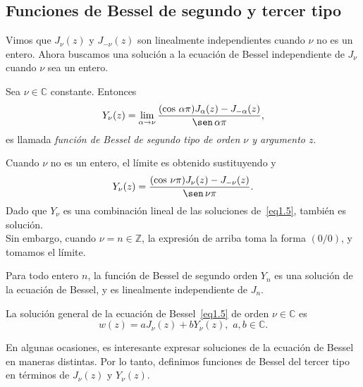 \documentclass[main.tex]{subfiles}
\begin{document}
\subsection{Funciones de Bessel de segundo y tercer tipo}
\noindent Vimos que $J_{\nu}(z)$ y $J_{-\nu}(z)$ son linealmente independientes cuando $\nu$ no es un entero. Ahora buscamos una solución a la ecuación de Bessel independiente de $J_{\nu}$ cuando $\nu$ sea un entero.
\begin{def.}\label{d1.5} %
  Sea $\nu\in\mathbb{C}$ constante. Entonces
  \begin{equation}
    \label{eq1.8}
    Y_{\nu}(z)=\lim_{\alpha\to\nu}\frac{(\cos\,\alpha\pi)J_{\alpha}(z)-J_{-\alpha}(z)}{\sen\,\alpha\pi},
  \end{equation}
  es llamada \textit{función de Bessel de segundo tipo de orden $\nu$ y argumento $z$}.
\end{def.}
\obs%
  Cuando $\nu$ no es un entero, el límite es obtenido sustituyendo y
  \[
    Y_{\nu}(z)=\frac{(\cos\,\nu\pi)J_{\nu}(z)-J_{-\nu}(z)}{\sen\,\nu\pi}.
  \]
  Dado que $Y_{\nu}$ es una combinación lineal de las soluciones de~\eqref{eq1.5}, también es solución.\\
 Sin embargo, cuando $\nu=n\in\mathbb{Z}$, la expresión de arriba toma la forma $(0/0)$, y tomamos el límite.
\begin{prop}\label{p1.6)} %
  Para todo entero $n$, la función de Bessel de segundo orden $Y_{n}$ es una solución de la ecuación de Bessel, y es linealmente independiente de $J_{n}$.
\end{prop}
\begin{cor}\label{c1.1} %
  La solución general de la ecuación de Bessel~\eqref{eq1.5} de orden $\nu\in\mathbb{C}$ es
  \[
    w(z)=aJ_{\nu}(z)+bY_{\nu}(z),\,\,a,b\in\mathbb{C}.
  \]
\end{cor}
En algunas ocasiones, es interesante expresar soluciones de la ecuación de Bessel en maneras distintas. Por lo tanto, definimos funciones de Bessel del tercer tipo en términos de $J_{\nu}(z)$ y $Y_{\nu}(z)$.
\end{document}
